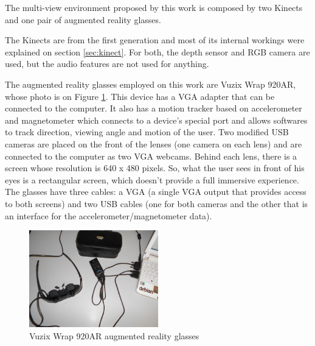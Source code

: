 \documentclass[msc, a4paper, classic, en]{ufbathesis}
\begin{document}
The multi-view environment proposed by this work is composed by two Kinects and one pair of augmented reality glasses.

The Kinects are from the first generation and most of its internal workings were explained on section \ref{sec:kinect}. For both, the depth sensor and RGB camera are used, but the audio features are not used for anything.

The augmented reality glasses employed on this work are Vuzix Wrap 920AR, whose photo is on Figure \ref{fig:glasses}. This device has a VGA adapter that can be connected to the computer. It also has a motion tracker based on accelerometer and magnetometer which connects to a device's special port and allows softwares to track direction, viewing angle and motion of the user. Two modified USB cameras are placed on the front of the lenses (one camera on each lens) and are connected to the computer as two VGA webcams. Behind each lens, there is a screen whose resolution is 640 x 480 pixels. So, what the user sees in front of his eyes is a rectangular screen, which doesn't provide a full immersive experience. The glasses have three cables: a VGA (a single VGA output that provides access to both screens) and two USB cables (one for both cameras and the other that is an interface for the accelerometer/magnetometer data).

\begin{figure}
\centering
\includegraphics[width=0.5\textwidth]{images/vuzix.png}
\caption{Vuzix Wrap 920AR augmented reality glasses}
\label{fig:glasses}
\end{figure}
\end{document}
